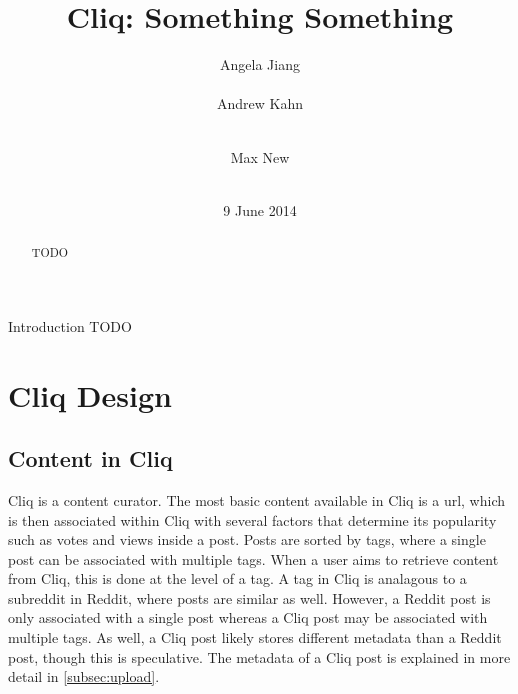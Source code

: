 \documentclass{sig-alternate}
\begin{document}
\nocite{*}


\title{Cliq: Something Something}


\author{
\alignauthor Angela Jiang\\
  \\
\alignauthor Andrew Kahn\\
  \\
\and
\alignauthor Max New\\
  \\
}

\date{9 June 2014}

\maketitle
\begin{abstract}
  TODO
\end{abstract}
\begin{section}{Introduction}
  TODO
\end{section}

\section{Cliq Design}

\subsection{Content in Cliq}

Cliq is a content curator. 
The most basic content available in Cliq is a url, which is then associated within Cliq with several factors that determine its popularity such as votes and views inside a post. 
Posts are sorted by tags, where a single post can be associated with multiple tags. 
When a user aims to retrieve content from Cliq, this is done at the level of a tag. 
A tag in Cliq is analagous to a subreddit in Reddit, where posts are similar as well. 
However, a Reddit post is only associated with a single post whereas a Cliq post may be associated with multiple tags. 
As well, a Cliq post likely stores different metadata than a Reddit post, though this is speculative. 
The metadata of a Cliq post is explained in more detail in \ref{subsec:upload}. 
\end{document}
